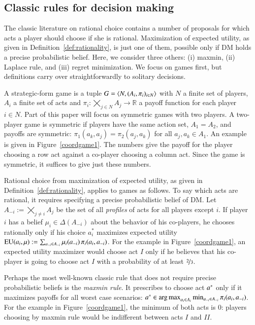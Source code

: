 \documentclass[fleqn,reqno,11pt]{article}
\begin{document}
\subsection{Classic rules for decision making}
\label{sec:choice-rules}

The classic literature on rational choice contains a number of proposals for which acts a
player should choose if she is rational. Maximization of expected utility, as
given in Definition~\ref{def:rationality}, is just one of them, possible only if DM holds a precise probabilistic belief.
Here, we consider three others:
(i) maxmin, (ii) Laplace rule, and (iii) regret minimization. 
We focus on games first, but definitions carry over straightforwardly to solitary decisions.

A strategic-form game is a tuple $ G=\left \langle  N, (A_i , \pi_i)_{i \in N} \right\rangle$ with $N$ a finite set of
players, $A_i$ a finite set of acts and $\pi_i: \bigtimes_{j \in N} A_j \rightarrow \mathbb{R}$ a payoff function for each player $i \in N$.
Part of this paper will focus on symmetric games with two players. A two-player game is
symmetric if players have the same action set, $A_1 = A_2$, and payoffs are symmetric:
$\pi_1(a_k, a_j) = \pi_2(a_j, a_k)$ for all $a_j,a_k \in A_1$. An example is given in
Figure~\ref{coordgame1}. The numbers give the payoff for the player choosing a row act against
a co-player choosing a column act. Since the game is symmetric, it suffices to give just these
numbers.

Rational choice from maximization of expected utility, as given in
Definition~\ref{def:rationality}, applies to games as follows. To say which acts are rational,
it requires specifying a precise probabilistic belief of DM. Let $A_{-i} := \bigtimes_{j \neq i} A_j$ be
the set of all \emph{profiles} of acts for all players except $i$. If player $i$ has a belief
$\mu_i \in \Delta(A_{-i})$ about the behavior of his co-players, he chooses rationally only if
his choice $a^*_i$ maximizes expected utility
$\operatorname{EU}(a_i, \mu) := \sum_{a_{-i} \in A_{-i}} \mu_i(a_{-i}) \thinspace \pi_i(a_i, a_{-i})$. For
the example in Figure~\ref{coordgame1}, an expected utility maximizer would choose act $I$ only if he
believes that his co-player is going to choose act $I$ with a probability of at least
$\nicefrac{2}{3}$.

Perhaps the most well-known classic rule that does not require precise probabilistic
beliefs is the \emph{maxmin rule}. It prescribes to choose act $a^*$ only if it
maximizes payoffs for all worst case scenarios:
$a^* \in \operatorname*{arg\,max}_{a_i \in A_i} \min_{a_{-i} \in A_{-i}} \pi_i(a_{i},
a_{-i})$.
For the example in Figure~\ref{coordgame1}, the minimum of both acts is 0: players choosing by maxmin
rule would be indifferent between acts $I$ and $II$.
\end{document}
